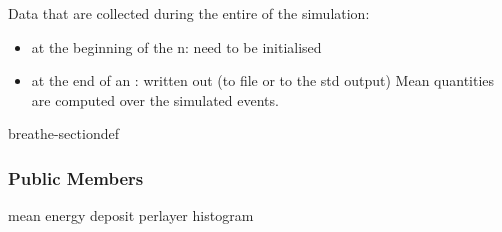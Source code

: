\documentclass[letterpaper,10pt,english]{sphinxmanual}
\begin{document}

\begin{fulllineitems}
\label{\detokenize{Simulation/SimulationCodeDoc:_CPPv47Results}}
\pysigstartsignatures
\pysigstartmultiline
{}
\pysigstopmultiline
\pysigstopsignatures{}
\sphinxAtStartPar
Data that are collected during the entire  of the simulation: 

\sphinxAtStartPar
\begin{itemize}
\item {} 
\sphinxAtStartPar
at the beginning of the n: need to be initialised

\item {} 
\sphinxAtStartPar
at the end of an : written out (to file or to the std output) Mean quantities are computed over the simulated events. 

\end{itemize}


\begin{sphinxuseclass}{breathe-sectiondef}\subsubsection*{Public Members}

\begin{fulllineitems}
\label{\detokenize{Simulation/SimulationCodeDoc:_CPPv4N7Results13fEdepPerLayerE}}
\pysigstartsignatures
\pysigstartmultiline
{}
\pysigstopmultiline
\pysigstopsignatures
\sphinxAtStartPar
mean energy deposit per\sphinxhyphen{}layer histogram 

\end{fulllineitems}



\end{sphinxuseclass}
\end{fulllineitems}
\end{document}
